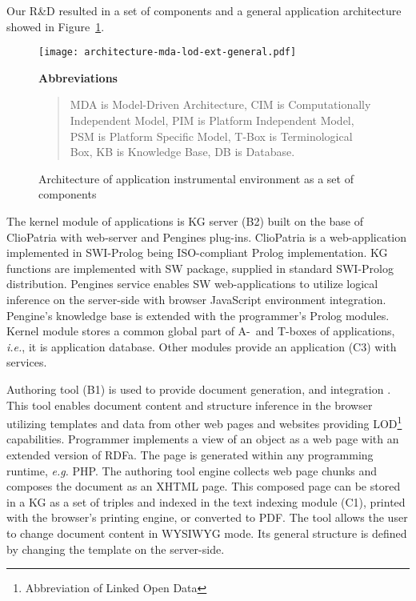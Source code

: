 \documentclass[a4paper]{jctart19a}
\begin{document}
Our R\&D resulted in a set of components and a general application architecture showed in Figure~\ref{fig:arch-services}.
\begin{figure}[!b]
  \begin{center}
    \texttt{[image: architecture-mda-lod-ext-general.pdf]}
  \end{center}
  \begin{center}
      \textbf{Abbreviations}%
    \end{center}
    \begin{quote}\scriptsize
      MDA is Model-Driven Architecture,
      CIM is Computationally Independent Model,
      PIM is Platform Independent Model,
      PSM is Platform Specific Model,
      T-Box is Terminological Box,
      KB is Knowledge Base,
      DB is Database.
    \end{quote}
  \caption{Architecture of application instrumental environment as a set of components}
  \label{fig:arch-services}
\end{figure}
The kernel module of applications is KG server (B2) built on the base of ClioPatria \cite{cliopatria} with web-server and Pengines plug-ins.  ClioPatria is a web-application implemented in SWI-Prolog \cite{swi} being ISO-compliant Prolog implementation.  KG functions are implemented with SW package, supplied in standard SWI-Prolog distribution.  Pengines service enables SW web-applications to utilize logical inference on the server-side \cite{pengines} with browser JavaScript environment integration.  Pengine's knowledge base is extended with the programmer's Prolog modules.  Kernel module stores a common global part of A-~and T-boxes of applications, \emph{i.e.}, it is application database.  Other modules provide an application (C3) with services.

Authoring tool (B1) is used to provide document generation, and integration \cite{zont19}.  This tool enables document content and structure inference in the browser utilizing templates and data from other web pages and websites providing LOD\footnote{Abbreviation of Linked Open Data} \cite{lod} capabilities.  Programmer implements a view of an object as a web page with an extended version of RDFa.  The page is generated within any programming runtime, \emph{e.g.} PHP.  The authoring tool engine collects web page chunks and composes the document as an XHTML page.  This composed page can be stored in a KG as a set of triples and indexed in the text indexing module (C1), printed with the browser's printing engine, or converted to PDF.  The tool allows the user to change document content in WYSIWYG mode.  Its general structure is defined by changing the template on the server-side.
\end{document}
